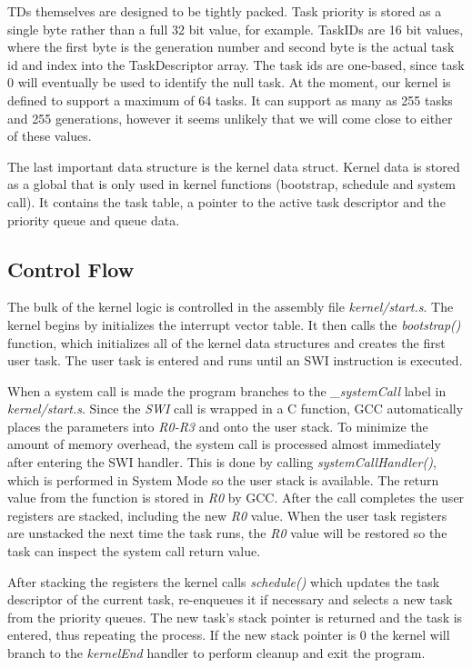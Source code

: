 \documentclass[twoside,a4paper]{refart}
\begin{document}
TDs themselves are designed to be tightly packed. Task priority is stored as a single byte rather than a full 32 bit value, for example. TaskIDs are 16 bit values, where the first byte is the generation number and second byte is the actual task id and index into the TaskDescriptor array. The task ids are one-based, since task 0 will eventually be used to identify the null task. At the moment, our kernel is defined to support a maximum of 64 tasks. It can support as many as 255 tasks and 255 generations, however it seems unlikely that we will come close to either of these values.

The last important data structure is the kernel data struct. Kernel data is stored as a global that is only used in  kernel functions (bootstrap, schedule and system call). It contains the task table, a pointer to the active task descriptor and the priority queue and queue data.

\subsection{Control Flow}
The bulk of the kernel logic is controlled in the assembly file \textit{kernel/start.s}. The kernel begins by initializes the interrupt vector table. It then calls the \textit{bootstrap()} function, which initializes all of the kernel data structures and creates the first user task. The user task is entered and runs until an SWI instruction is executed.

When a system call is made the program branches to the \textit{\_systemCall} label in \textit{kernel/start.s}. Since the \textit{SWI} call is wrapped in a C function, GCC automatically places the parameters into \textit{R0-R3} and onto the user stack. To minimize the amount of memory overhead, the system call is processed almost immediately after entering the SWI handler. This is done by calling \textit{systemCallHandler()}, which is performed in System Mode so the user stack is available. The return value from the function is stored in \textit{R0} by GCC. After the call completes the user registers are stacked, including the new \textit{R0} value. When the user task registers are unstacked the next time the task runs, the \textit{R0} value will be restored so the task can inspect the system call return value.

After stacking the registers the kernel calls \textit{schedule()} which updates the task descriptor of the current task, re-enqueues it if necessary and selects a new task from the priority queues. The new task’s stack pointer is returned and the task is entered, thus repeating the process. If the new stack pointer is 0 the kernel will branch to the \textit{kernelEnd} handler to perform cleanup and exit the program.
\end{document}
